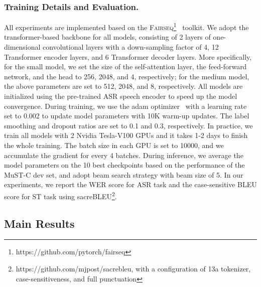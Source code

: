 \documentclass[letterpaper]{article} %
\begin{document}
\subsubsection*{Training Details and Evaluation.}
All experiments are implemented based on the \textsc{Fairseq}\footnote{https://github.com/pytorch/fairseq}~\cite{Ott2019fairseqAF} toolkit.
We adopt the transformer-based backbone for all models, consisting of 2 layers of one-dimensional convolutional layers with a down-sampling factor of 4, 12 Transformer encoder layers, and 6 Transformer decoder layers.
More specifically, for the small model, we set the size of the self-attention layer, the feed-forward network, and the head to 256, 2048, and 4, respectively; for the medium model, the above parameters are set to 512, 2048, and 8, respectively.
All models are initialized using the pre-trained ASR speech encoder to speed up the model convergence.
During training, we use the adam optimizer~\cite{Kingma2015AdamAM} with a learning rate set to 0.002 to update model parameters with 10K warm-up updates.
The label smoothing and dropout ratios are set to 0.1 and 0.3, respectively.
In practice, we train all models with 2 Nvidia Tesla-V100 GPUs and it takes 1-2 days to finish the whole training.
The batch size in each GPU is set to 10000, and we accumulate the gradient for every 4 batches.
During inference, we average the model parameters on the 10 best checkpoints based on the performance of the MuST-C dev set, and adopt beam search strategy with beam size of 5.
In our experiments, we report the WER score for ASR task and the case-sensitive BLEU score \cite{Papineni2002BleuAM} for ST task using sacreBLEU\footnote{https://github.com/mjpost/sacrebleu, with a configuration
of 13a tokenizer, case-sensitiveness, and full punctuation}.



\subsection{Main Results}
\end{document}
